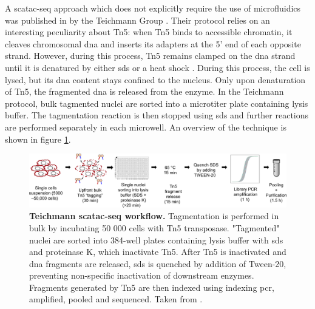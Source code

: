 A \acrshort{scatac-seq} approach which does not explicitly require the use of microfluidics was published in \citeyear{chen2018} by the Teichmann Group \citep{chen2018}. Their protocol relies on an interesting peculiarity about Tn5: when Tn5 binds to accessible chromatin, it cleaves chromosomal \acrshort{dna} and inserts its adapters at the 5' end of each opposite strand. However, during this process, Tn5 remains clamped on the \acrshort{dna} strand until it is denatured by either \acrshort{sds} or a heat shock \citep{picelli2014b}. During this process, the cell is lysed, but its \acrshort{dna} content stays confined to the nucleus. Only upon denaturation of Tn5, the fragmented \acrshort{dna} is released from the enzyme. In the Teichmann protocol, bulk tagmented nuclei are sorted into a microtiter plate containing lysis buffer. The tagmentation reaction is then stopped using \acrshort{sds} and further reactions are performed separately in each microwell. An overview of the technique is shown in figure \ref{fig:chen2018_edited}.\pms

\begin{figure}[ht]
	\centerfloat
	\includegraphics[width=\textwidth]{./ims/chen2018_edited.png}
	\caption[Teichmann \acrshort{scatac-seq} workflow]{\textbf{Teichmann \acrshort{scatac-seq} workflow.} Tagmentation is performed in bulk by incubating 50 000 cells with Tn5 transposase. "Tagmented" nuclei are sorted into 384-well plates containing lysis buffer with \acrshort{sds} and proteinase K, which inactivate Tn5. After Tn5 is inactivated and \acrshort{dna} fragments are released, \acrshort{sds} is quenched by addition of Tween-20, preventing non-specific inactivation of downstream enzymes. Fragments generated by Tn5 are then indexed using indexing \acrshort{pcr}, amplified, pooled and sequenced. Taken from \cite{chen2018}.}
	\label{fig:chen2018_edited}
\end{figure}

